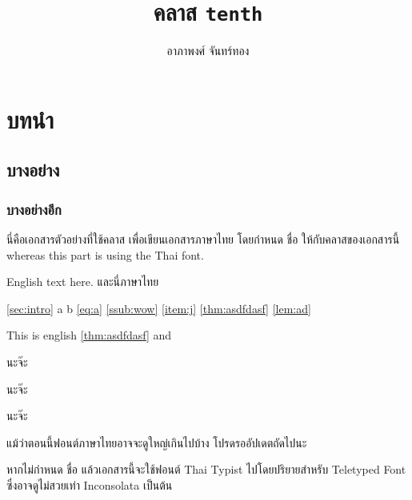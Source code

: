 \documentclass[11pt,twoside,secnum]{ten}
\title{คลาส \texttt{tenth}}
\author{อาภาพงศ์ จันทร์ทอง}
\begin{document}
    \maketitle

    \section{บทนำ \label{sec:intro}}

    \subsection{บางอย่าง}

    \subsubsection{บางอย่างอีก \label{ssub:wow}}

    นี่คือเอกสารตัวอย่างที่ใช้คลาส  เพื่อเขียนเอกสารภาษาไทย โดยกำหนด  ชื่อ  ให้กับคลาสของเอกสารนี้  whereas this part is using the Thai font.

    \begin{eng}
        English text here. {\tha และนี่ภาษาไทย}
    \end{eng}

    \autoref{sec:intro} a \sectionautorefname{} b \autoref{eq:a} \autoref{ssub:wow} \autoref{item:j}
    \Hfootnoteautorefname{} \AMSautorefname{} \autoref{thm:asdfdasf} \autoref{lem:ad} \lemmaautorefname{}

    { This is english \autoref{thm:asdfdasf} and \chaptername}

    \begin{theorem}
        \label{thm:asdfdasf}
        นะจ๊ะ
    \end{theorem}
    \unskip
    \begin{lemma}
        \label{lem:ad}
        นะจ๊ะ
    \end{lemma}

    \begin{remark}
        นะจ๊ะ
    \end{remark}

    แม้ว่าตอนนี้ฟอนต์ภาษาไทยอาจจะดูใหญ่เกินไปบ้าง โปรดรออัปเดตถัดไปนะ

    หากไม่กำหนด  ชื่อ  แล้วเอกสารนี้จะใช้ฟอนต์ Thai Typist ไปโดยปริยายสำหรับ Teletyped Font ซึ่งอาจดูไม่สวยเท่า Inconsolata เป็นต้น
\end{document}
